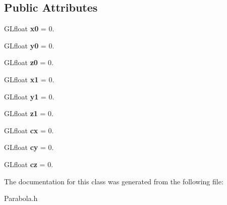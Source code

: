 \subsection*{Public Attributes}
\begin{DoxyCompactItemize}
\item 
\mbox{\label{class_parabola_a8b0796be982e29910afd5d4621e688f8}} 
G\+Lfloat {\bfseries x0} = 0.
\item 
\mbox{\label{class_parabola_a4d1873ce27306f7fc2ca3f7ea581bd77}} 
G\+Lfloat {\bfseries y0} = 0.
\item 
\mbox{\label{class_parabola_a5b25f72d1baaabc25f94108665052a98}} 
G\+Lfloat {\bfseries z0} = 0.
\item 
\mbox{\label{class_parabola_a10032698d1a003969979ae52ce25f907}} 
G\+Lfloat {\bfseries x1} = 0.
\item 
\mbox{\label{class_parabola_acd479351bec2260b6d77a581daf10948}} 
G\+Lfloat {\bfseries y1} = 0.
\item 
\mbox{\label{class_parabola_ae987f29da3825769c8bcfa1001b7980a}} 
G\+Lfloat {\bfseries z1} = 0.
\item 
\mbox{\label{class_parabola_a01072566a5ab65464cc421bb43113a5b}} 
G\+Lfloat {\bfseries cx} = 0.
\item 
\mbox{\label{class_parabola_aa74168de12a1d4a510339cbe3c6d8740}} 
G\+Lfloat {\bfseries cy} = 0.
\item 
\mbox{\label{class_parabola_a10ff03776abe8f4f2a3734f0b00f0b3d}} 
G\+Lfloat {\bfseries cz} = 0.
\end{DoxyCompactItemize}


The documentation for this class was generated from the following file\+:\begin{DoxyCompactItemize}
\item 
Parabola.\+h\end{DoxyCompactItemize}
